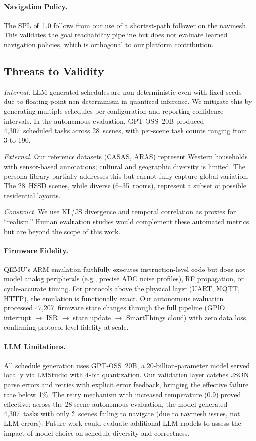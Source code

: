\paragraph{Navigation Policy.}
The SPL of~1.0 follows from our use of a shortest-path follower
on the navmesh.  This validates the goal reachability pipeline
but does not evaluate learned navigation policies, which is
orthogonal to our platform contribution.

\subsection{Threats to Validity}

\emph{Internal.}
LLM-generated schedules are non-deterministic even with fixed seeds
due to floating-point non-determinism in quantized inference.  We mitigate
this by generating multiple schedules per configuration and reporting
confidence intervals.  In the autonomous evaluation, GPT-OSS~20B
produced 4{,}307~scheduled tasks across 28~scenes, with per-scene
task counts ranging from 3 to 190.

\emph{External.}
Our reference datasets (CASAS, ARAS) represent Western households
with sensor-based annotations; cultural and geographic diversity is
limited.  The persona library partially addresses this but cannot
fully capture global variation.  The 28~HSSD scenes, while diverse
(6--35~rooms), represent a subset of possible residential layouts.

\emph{Construct.}
We use KL/JS divergence and temporal correlation as proxies for
``realism.''  Human evaluation studies would complement these
automated metrics but are beyond the scope of this work.

\paragraph{Firmware Fidelity.}
QEMU's ARM emulation faithfully executes instruction-level code but
does not model analog peripherals (e.g., precise ADC noise profiles),
RF propagation, or cycle-accurate timing.  For protocols above the
physical layer (UART, MQTT, HTTP), the emulation is functionally
exact.  Our autonomous evaluation
processed 47{,}207~firmware state changes through the full pipeline
(GPIO interrupt $\to$ ISR $\to$ state update $\to$ SmartThings cloud)
with zero data loss, confirming protocol-level fidelity at scale.

\paragraph{LLM Limitations.}
All schedule generation uses GPT-OSS~20B, a 20-billion-parameter model
served locally via LMStudio with 4-bit quantization.
Our validation layer catches JSON parse errors and retries with explicit
error feedback, bringing the effective failure rate below~1\%.
The retry mechanism with increased temperature (0.9) proved effective:
across the 28-scene autonomous evaluation, the model generated
4{,}307~tasks with only 2~scenes failing to navigate (due to navmesh
issues, not LLM errors).
Future work could evaluate additional LLM models to assess the
impact of model choice on schedule diversity and correctness.

